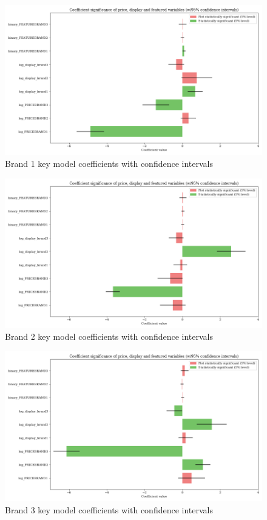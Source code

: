 \documentclass[a4paper,11pt]{article}
\begin{document}
\begin{figure}
  \centering
  \includegraphics[scale=0.47]{brand1_modelfinal_significance}
  \caption{Brand 1 key model coefficients with confidence intervals }\label{fig:brand1-significance}
\end{figure}

\begin{figure}
  \centering
  \includegraphics[scale=0.47]{brand2_modelfinal_significance}
  \caption{Brand 2 key model coefficients with confidence intervals }\label{fig:brand2-significance}
\end{figure}

\begin{figure}
  \centering
  \includegraphics[scale=0.47]{brand3_modelfinal_significance}
  \caption{Brand 3 key model coefficients with confidence intervals }\label{fig:brand3-significance}
\end{figure}
\end{document}
